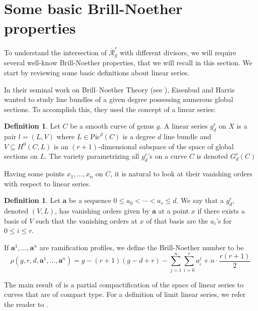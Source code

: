 \documentclass{article}
\theoremstyle{plain}
\theoremstyle{definition}
\newtheorem{defi}[trm]{Definition}
\begin{document}
 \section{Some basic Brill-Noether properties} \label{basicBN}
 
 To understand the intersection of $\overline{\mathcal{R}}^r_g$ with different divisors, we will require several well-know Brill-Noether properties, that we will recall in this section. We start by reviewing some basic definitions about linear series. 
  
 In their seminal work on Brill--Noether Theory (see \cite{limitlinearbasic}), Eisenbud and Harris wanted to study line bundles of a given degree possessing numerous global sections. To accomplish this, they used the concept of a linear series:
 
 \begin{defi} Let $C$ be a smooth curve of genus $g$. A linear series $g^r_d$ on $X$ is a pair $l = (L, V)$ where $L \in \textrm{Pic}^d(C)$ is a degree $d$ line bundle and $V\subseteq H^0(C,L)$ is an $(r+1)$-dimensional subspace of the space of global sections on $L$. The variety parametrizing all $g^r_d$'s on a curve $C$ is denoted $G^r_d(C)$ 
 \end{defi}
 
 Having some points $x_1, \ldots, x_n$ on $C$, it is natural to look at their vanishing orders with respect to linear series. 
 
 \begin{defi}
Let $\textbf{a}$ be a sequence $0\leq a_0< \cdots < a_r \leq d$. We say that a $g^r_d$, denoted $(V,L)$, has vanishing orders given by $\textbf{a}$ at a point $x$ if there exists a basis of $V$ such that the vanishing orders at $x$ of that basis are the $a_i$'s for $0\leq i \leq r$. 
 \end{defi}

 
 
 If $\textbf{a}^1, \ldots, \textbf{a}^n$ are ramification profiles, we define the Brill-Noether number to be 
 \[ \rho(g,r,d,\textbf{a}^1,\ldots,\textbf{a}^n) = g-(r+1)(g-d+r)- \sum_{j=1}^{n}\sum_{i=0}^{r}a^j_i + n\cdot \frac{r(r+1)}{2}\]
 
The main result of \cite{limitlinearbasic} is a partial compactification of the space of linear series to curves that are of compact type. For a definition of limit linear series, we refer the reader to \cite{limitlinearbasic}.
 
\end{document}

